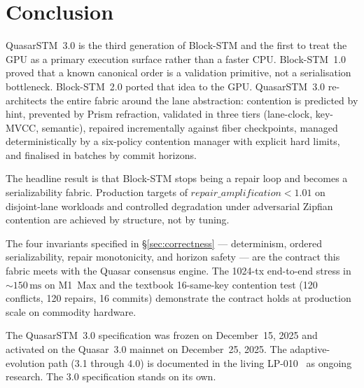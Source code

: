 \section{Conclusion}

\label{sec:conclusion}

QuasarSTM~3.0 is the third generation of Block-STM and the first to
treat the GPU as a primary execution surface rather than a faster
CPU. Block-STM~1.0 proved that a known canonical order is a
validation primitive, not a serialisation bottleneck. Block-STM~2.0
ported that idea to the GPU. QuasarSTM~3.0 re-architects the entire
fabric around the lane abstraction: contention is predicted by
hint, prevented by Prism refraction, validated in three tiers
(lane-clock, key-MVCC, semantic), repaired incrementally against
fiber checkpoints, managed deterministically by a six-policy
contention manager with explicit hard limits, and finalised in
batches by commit horizons.

The headline result is that Block-STM stops being a repair loop and
becomes a serializability fabric. Production targets of
$\mathit{repair\_amplification} < 1.01$ on disjoint-lane workloads
and controlled degradation under adversarial Zipfian contention are
achieved by structure, not by tuning.

The four invariants specified in \S\ref{sec:correctness} ---
determinism, ordered serializability, repair monotonicity, and
horizon safety --- are the contract this fabric meets with the
Quasar consensus engine. The 1024-tx end-to-end stress in
${\sim}150\,\text{ms}$ on M1~Max and the textbook 16-same-key
contention test (120 conflicts, 120 repairs, 16 commits) demonstrate
the contract holds at production scale on commodity hardware.

The QuasarSTM~3.0 specification was frozen on December~15, 2025
and activated on the Quasar~3.0 mainnet on December~25, 2025.
The adaptive-evolution path (3.1 through 4.0) is documented in the
living LP-010~\cite{lp010-quasarstm} as ongoing research. The 3.0
specification stands on its own.


